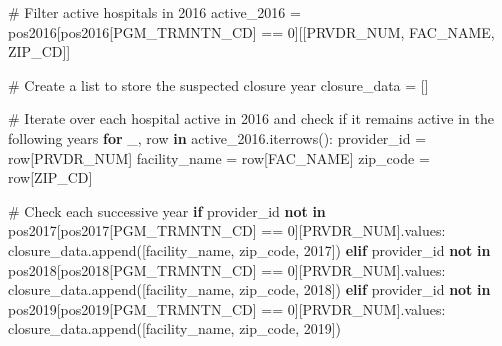\documentclass[
  letterpaper,
  DIV=11,
  numbers=noendperiod]{scrartcl}
\newenvironment{Shaded}{\begin{snugshade}}{\end{snugshade}}
\newcommand{\CommentTok}[1]{\textcolor[rgb]{0.37,0.37,0.37}{#1}}
\newcommand{\ControlFlowTok}[1]{\textcolor[rgb]{0.00,0.23,0.31}{\textbf{#1}}}
\newcommand{\DecValTok}[1]{\textcolor[rgb]{0.68,0.00,0.00}{#1}}
\newcommand{\KeywordTok}[1]{\textcolor[rgb]{0.00,0.23,0.31}{\textbf{#1}}}
\newcommand{\NormalTok}[1]{\textcolor[rgb]{0.00,0.23,0.31}{#1}}
\newcommand{\OperatorTok}[1]{\textcolor[rgb]{0.37,0.37,0.37}{#1}}
\newcommand{\StringTok}[1]{\textcolor[rgb]{0.13,0.47,0.30}{#1}}
\begin{document}
\begin{Shaded}
\begin{Highlighting}[]
\CommentTok{\# Filter active hospitals in 2016}
\NormalTok{active\_2016 }\OperatorTok{=}\NormalTok{ pos2016[pos2016[}\StringTok{\textquotesingle{}PGM\_TRMNTN\_CD\textquotesingle{}}\NormalTok{] }\OperatorTok{==} \DecValTok{0}\NormalTok{][[}\StringTok{\textquotesingle{}PRVDR\_NUM\textquotesingle{}}\NormalTok{, }\StringTok{\textquotesingle{}FAC\_NAME\textquotesingle{}}\NormalTok{, }\StringTok{\textquotesingle{}ZIP\_CD\textquotesingle{}}\NormalTok{]]}

\CommentTok{\# Create a list to store the suspected closure year}
\NormalTok{closure\_data }\OperatorTok{=}\NormalTok{ []}

\CommentTok{\# Iterate over each hospital active in 2016 and check if it remains active in the following years}
\ControlFlowTok{for}\NormalTok{ \_, row }\KeywordTok{in}\NormalTok{ active\_2016.iterrows():}
\NormalTok{    provider\_id }\OperatorTok{=}\NormalTok{ row[}\StringTok{\textquotesingle{}PRVDR\_NUM\textquotesingle{}}\NormalTok{]}
\NormalTok{    facility\_name }\OperatorTok{=}\NormalTok{ row[}\StringTok{\textquotesingle{}FAC\_NAME\textquotesingle{}}\NormalTok{]}
\NormalTok{    zip\_code }\OperatorTok{=}\NormalTok{ row[}\StringTok{\textquotesingle{}ZIP\_CD\textquotesingle{}}\NormalTok{]}
    
    \CommentTok{\# Check each successive year}
    \ControlFlowTok{if}\NormalTok{ provider\_id }\KeywordTok{not} \KeywordTok{in}\NormalTok{ pos2017[pos2017[}\StringTok{\textquotesingle{}PGM\_TRMNTN\_CD\textquotesingle{}}\NormalTok{] }\OperatorTok{==} \DecValTok{0}\NormalTok{][}\StringTok{\textquotesingle{}PRVDR\_NUM\textquotesingle{}}\NormalTok{].values:}
\NormalTok{        closure\_data.append([facility\_name, zip\_code, }\DecValTok{2017}\NormalTok{])}
    \ControlFlowTok{elif}\NormalTok{ provider\_id }\KeywordTok{not} \KeywordTok{in}\NormalTok{ pos2018[pos2018[}\StringTok{\textquotesingle{}PGM\_TRMNTN\_CD\textquotesingle{}}\NormalTok{] }\OperatorTok{==} \DecValTok{0}\NormalTok{][}\StringTok{\textquotesingle{}PRVDR\_NUM\textquotesingle{}}\NormalTok{].values:}
\NormalTok{        closure\_data.append([facility\_name, zip\_code, }\DecValTok{2018}\NormalTok{])}
    \ControlFlowTok{elif}\NormalTok{ provider\_id }\KeywordTok{not} \KeywordTok{in}\NormalTok{ pos2019[pos2019[}\StringTok{\textquotesingle{}PGM\_TRMNTN\_CD\textquotesingle{}}\NormalTok{] }\OperatorTok{==} \DecValTok{0}\NormalTok{][}\StringTok{\textquotesingle{}PRVDR\_NUM\textquotesingle{}}\NormalTok{].values:}
\NormalTok{        closure\_data.append([facility\_name, zip\_code, }\DecValTok{2019}\NormalTok{])}


\end{Highlighting}
\end{Shaded}
\end{document}
